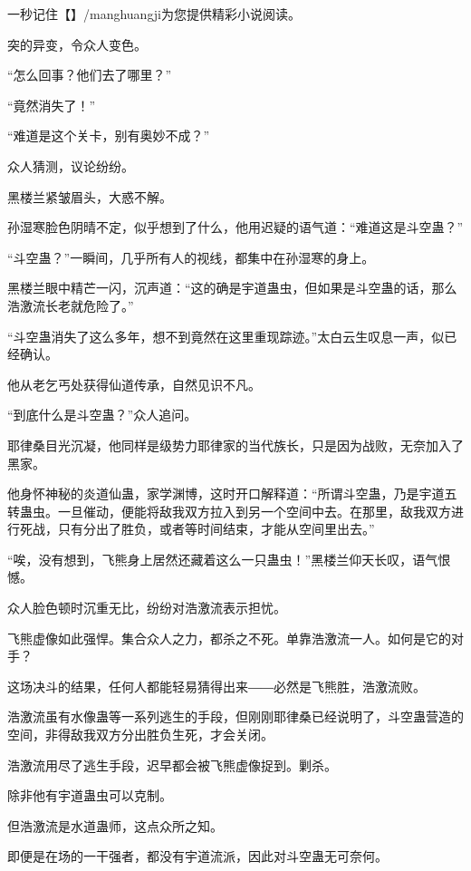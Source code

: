 
\begin{this_body}

一秒记住【】/manghuangji为您提供精彩小说阅读。

突的异变，令众人变色。

“怎么回事？他们去了哪里？”

“竟然消失了！”

“难道是这个关卡，别有奥妙不成？”

众人猜测，议论纷纷。

黑楼兰紧皱眉头，大惑不解。

孙湿寒脸色阴晴不定，似乎想到了什么，他用迟疑的语气道：“难道这是斗空蛊？”

“斗空蛊？”一瞬间，几乎所有人的视线，都集中在孙湿寒的身上。

黑楼兰眼中精芒一闪，沉声道：“这的确是宇道蛊虫，但如果是斗空蛊的话，那么浩激流长老就危险了。”

“斗空蛊消失了这么多年，想不到竟然在这里重现踪迹。”太白云生叹息一声，似已经确认。

他从老乞丐处获得仙道传承，自然见识不凡。

“到底什么是斗空蛊？”众人追问。

耶律桑目光沉凝，他同样是级势力耶律家的当代族长，只是因为战败，无奈加入了黑家。

他身怀神秘的炎道仙蛊，家学渊博，这时开口解释道：“所谓斗空蛊，乃是宇道五转蛊虫。一旦催动，便能将敌我双方拉入到另一个空间中去。在那里，敌我双方进行死战，只有分出了胜负，或者等时间结束，才能从空间里出去。”

“唉，没有想到，飞熊身上居然还藏着这么一只蛊虫！”黑楼兰仰天长叹，语气恨憾。

众人脸色顿时沉重无比，纷纷对浩激流表示担忧。

飞熊虚像如此强悍。集合众人之力，都杀之不死。单靠浩激流一人。如何是它的对手？

这场决斗的结果，任何人都能轻易猜得出来――必然是飞熊胜，浩激流败。

浩激流虽有水像蛊等一系列逃生的手段，但刚刚耶律桑已经说明了，斗空蛊营造的空间，非得敌我双方分出胜负生死，才会关闭。

浩激流用尽了逃生手段，迟早都会被飞熊虚像捉到。剿杀。

除非他有宇道蛊虫可以克制。

但浩激流是水道蛊师，这点众所之知。

即便是在场的一干强者，都没有宇道流派，因此对斗空蛊无可奈何。


\end{this_body}
